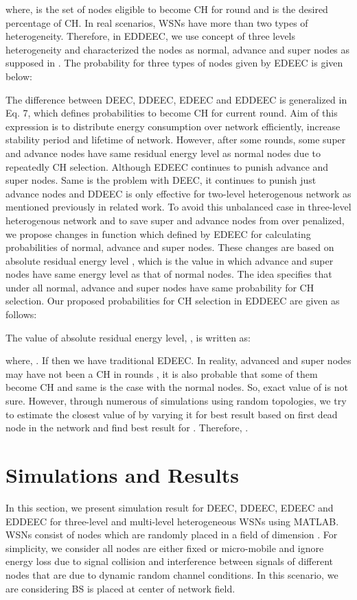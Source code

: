 \documentclass[3p,times,procedia]{elsarticle}
\begin{document}
where,  is the set of nodes eligible to become CH for round  and  is the desired percentage of CH.
In real scenarios, WSNs have more than two types of heterogeneity. Therefore, in EDDEEC, we use concept of three levels heterogeneity and characterized the nodes as normal, advance and super nodes as supposed in \cite{Reference 12}. The probability for three types of nodes given by EDEEC is given below:




The difference between DEEC, DDEEC, EDEEC and EDDEEC is generalized in Eq. 7, which defines probabilities to become CH for current round. Aim of this expression is to distribute energy consumption over network efficiently, increase stability period and lifetime of network. However, after some rounds, some super and advance nodes have same residual energy level as normal nodes due to repeatedly CH selection. Although EDEEC continues to punish advance and super nodes. Same is the problem with DEEC, it continues to punish just advance nodes and DDEEC is only effective for two-level heterogenous network as mentioned previously in related work. To avoid this unbalanced case in three-level heterogenous network and to save super and advance nodes from over penalized, we propose changes in function which defined by EDEEC for calculating probabilities of normal, advance and super nodes. These changes are based on absolute residual energy level , which is the value in which advance and super nodes have same energy level as that of normal nodes. The idea specifies that under  all normal, advance and super nodes have same probability for CH selection. Our proposed probabilities for CH selection in EDDEEC are given as follows:


\normalsize

The value of absolute residual energy level, , is written as:



where, . If  then we have traditional EDEEC. In reality, advanced and super nodes may have not been a CH in rounds , it is also probable that some of them become CH and same is the case with the normal nodes. So, exact value of  is not sure. However, through numerous of simulations using random topologies, we try to estimate the closest value of  by varying it for best result based on first dead node in the network and find best result for . Therefore, .

\section{Simulations and Results}
In this section, we present simulation result for DEEC, DDEEC, EDEEC and EDDEEC for three-level and multi-level heterogeneous WSNs using MATLAB. WSNs consist of  nodes which are randomly placed in a field of dimension . For simplicity, we consider all nodes are either fixed or micro-mobile and ignore energy loss due to signal collision and interference between signals of different nodes that are due to dynamic random channel conditions. In this scenario, we are considering BS is placed at center of network field.
\end{document}
